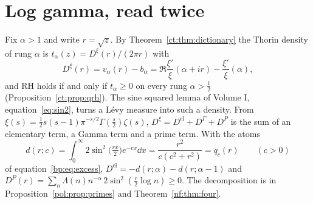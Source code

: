\section{Log gamma, read twice}\label{lg:sec:twice}
Fix $\alpha>1$ and write $r=\sqrt z$. By Theorem~\ref{ct:thm:dictionary} the Thorin density of rung $\alpha$ is $t_\alpha(z)=D^\xi(r)/(2\pi r)$ with
\[
D^\xi(r)=v_\alpha(r)-b_\alpha=\Re\frac{\xi'}{\xi}(\alpha+ir)-\frac{\xi'}{\xi}(\alpha),
\]
and RH holds if and only if $t_\alpha\ge0$ on every rung $\alpha>\frac12$ (Proposition~\ref{ct:prop:qrh}). The sine squared lemma of Volume I, equation~\eqref{eq:sin2}, turns a Lévy measure into such a density. From $\xi(s)=\frac12s(s-1)\pi^{-s/2}\Gamma(\frac s2)\zeta(s)$, $D^\xi=D^{\mathrm{el}}+D^\Gamma+D^P$ is the sum of an elementary term, a Gamma term and a prime term. With the atoms
\[
d(r;c)=\int_0^\infty2\sin^2\bigl(\tfrac{rx}2\bigr)e^{-cx}\dd x=\frac{r^2}{c(c^2+r^2)}=q_c(r)\qquad(c>0)
\]
of equation~\eqref{bp:eq:excess}, $D^{\mathrm{el}}=-d(r;\alpha)\allowbreak-d(r;\alpha-1)$ and $D^P(r)=\sum_n\Lambda(n)n^{-\alpha}\allowbreak\,2\sin^2(\frac r2\log n)\ge0$. The decomposition is in Proposition~\ref{pol:prop:primes} and Theorem~\ref{nf:thm:four}.

